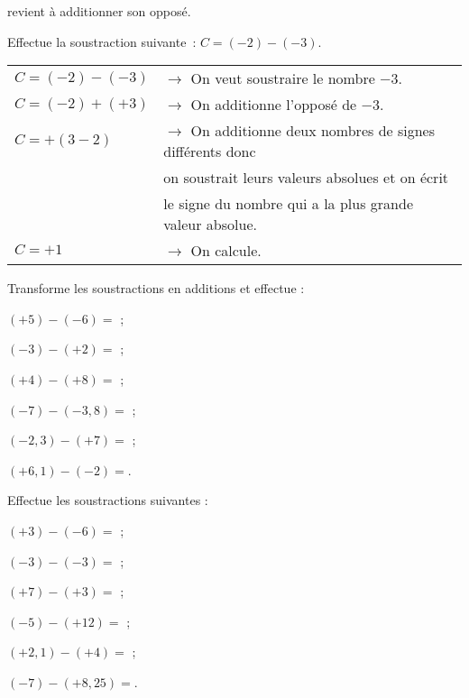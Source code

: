 \begin{methode*1}

\begin{aconnaitre}
 revient à additionner son opposé.
\end{aconnaitre}

 \begin{exemple*1}
Effectue la soustraction suivante : $C = (-2) - (-3)$.
\begin{tabular}{ll} 
$C = (-2) - (-3)$ & $\rightarrow$ On veut soustraire le nombre $-3$. \\
$C = (-2) + (+3)$ & $\rightarrow$ On additionne l'opposé de $-3$. \\
$C = + (3 - 2)$ & $\rightarrow$ On additionne deux nombres de signes différents donc \\
 & \phantom{$\rightarrow$} on soustrait leurs valeurs absolues et on écrit \\
 & \phantom{$\rightarrow$} le signe du nombre qui a la plus grande valeur absolue. \\
$C = +1$ & $\rightarrow$ On calcule. \\
\end{tabular}
 \end{exemple*1}

\exercice
Transforme les soustractions en additions et effectue :\\[.5em]
\begin{colenumerate}{1}
 \item $(+5) - (-6)=$ \dotfill; \\[.1em]
 \item $(-3) - (+2)=$ \dotfill; \\[.1em]
 \item $(+4) - (+8)=$ \dotfill; \\[.1em]
 \item $(-7) - (-3,8)=$ \dotfill; \\[.1em]
 \item $(-2,3) - (+7)=$ \dotfill; \\[.1em]
 \item $(+6,1) - (-2)=$\dotfill.
 \end{colenumerate}

\exercice
Effectue les soustractions suivantes : \\[.1em]
\begin{colenumerate}{1}
 \item $(+3) - (-6)=$ \dotfill; \\[.1em]
 \item $(-3) - (-3)=$ \dotfill; \\[.1em]
 \item $(+7) - (+3)=$ \dotfill; \\[.1em]
 \item $(-5) - (+12)=$ \dotfill; \\[.1em]
 \item $(+2,1) - (+4)=$ \dotfill; \\[.1em]
 \item $(-7) - (+8,25)=$\dotfill.
 \end{colenumerate}

 \end{methode*1}

